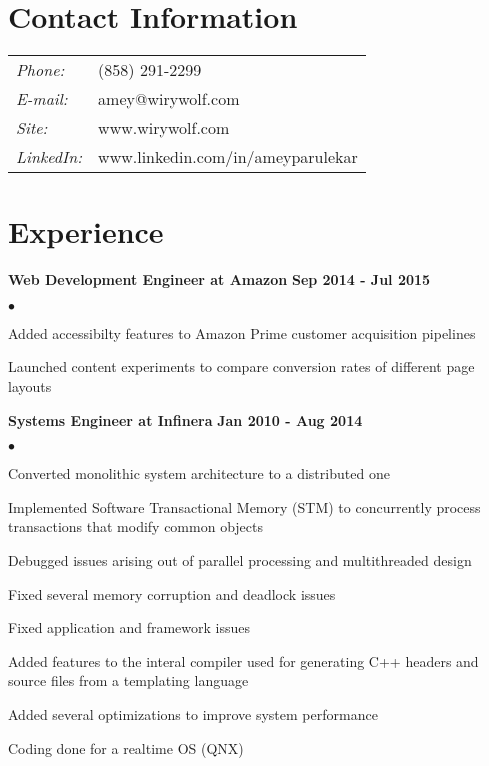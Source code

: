 \documentclass[margin,line]{res}
\newenvironment{list2}{
  \begin{list}{$\bullet$}{%
      \setlength{\itemsep}{0in}
      \setlength{\parsep}{0in} \setlength{\parskip}{0in}
      \setlength{\topsep}{0in} \setlength{\partopsep}{0in}
      \setlength{\leftmargin}{0.2in}}}{\end{list}}
\begin{document}

\begin{resume}
\section{\sc Contact Information}
\vspace{.05in}
\begin{tabular}{l l}
{\it Phone:} & (858) 291-2299 \\
{\it E-mail:} & amey@wirywolf.com \\
{\it Site:} & www.wirywolf.com \\
{\it LinkedIn:} & www.linkedin.com/in/ameyparulekar \\
\end{tabular}

\section{\sc Experience}

{\bf Web Development Engineer at Amazon} \hfill {\bf Sep 2014 - Jul 2015}\\
\begin{list2}
\item Added accessibilty features to Amazon Prime customer acquisition pipelines
\item Launched content experiments to compare conversion rates of different page layouts
\end{list2}

{\bf Systems Engineer at Infinera} \hfill {\bf Jan 2010 - Aug 2014}\\
\begin{list2}
\item Converted monolithic system architecture to a distributed one
\item Implemented Software Transactional Memory (STM) to concurrently process transactions that modify common objects
\item Debugged issues arising out of parallel processing and multithreaded design
\item Fixed several memory corruption and deadlock issues
\item Fixed application and framework issues
\item Added features to the interal compiler used for generating C++ headers and source files from a templating language
\item Added several optimizations to improve system performance
\item Coding done for a realtime OS (QNX)
\end{list2}


\end{resume}
\end{document}
